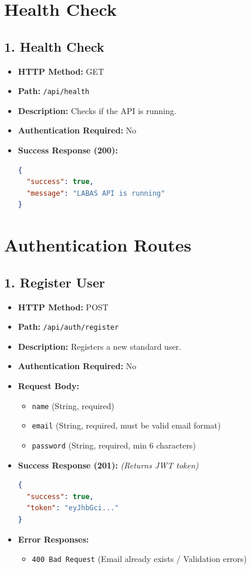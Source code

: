 \documentclass[12pt,a4paper]{article}
\begin{document}
\section{Health Check}
\subsection{1. Health Check}
\begin{itemize}
    \item \textbf{HTTP Method:} GET
    \item \textbf{Path:} \texttt{/api/health}
    \item \textbf{Description:} Checks if the API is running.
    \item \textbf{Authentication Required:} No
    \item \textbf{Success Response (200):}
\begin{lstlisting}[language=json]
{
  "success": true,
  "message": "LABAS API is running"
}
\end{lstlisting}
\end{itemize}

\section{Authentication Routes}

\subsection{1. Register User}
\begin{itemize}
    \item \textbf{HTTP Method:} POST
    \item \textbf{Path:} \texttt{/api/auth/register}
    \item \textbf{Description:} Registers a new standard user.
    \item \textbf{Authentication Required:} No
    \item \textbf{Request Body:}
    \begin{itemize}
        \item \texttt{name} (String, required)
        \item \texttt{email} (String, required, must be valid email format)
        \item \texttt{password} (String, required, min 6 characters)
    \end{itemize}
    \item \textbf{Success Response (201):} \textit{(Returns JWT token)}
\begin{lstlisting}[language=json]
{
  "success": true,
  "token": "eyJhbGci..."
}
\end{lstlisting}
    \item \textbf{Error Responses:} 
    \begin{itemize}
        \item \texttt{400 Bad Request} (Email already exists / Validation errors)
    \end{itemize}
\end{itemize}
\end{document}
